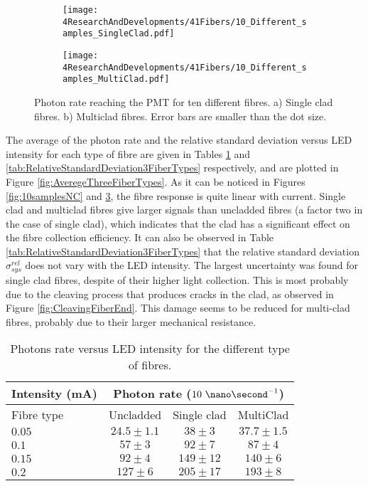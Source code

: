 \begin{figure}
\centering
    \begin{subfigure}[b]{1\textwidth}
    \centering
    \texttt{[image: 4ResearchAndDevelopments/41Fibers/10\_Different\_samples\_SingleClad.pdf]}  
    \caption{\label{subfig:10samplesSC}}
    \end{subfigure}
    \hfill
    \begin{subfigure}[b]{1\textwidth}
    \centering
    \texttt{[image: 4ResearchAndDevelopments/41Fibers/10\_Different\_samples\_MultiClad.pdf]}  
    \caption{\label{subfig:10samplesMC}}
    \end{subfigure}
 \caption{Photon rate reaching the PMT for ten different fibres. a) Single clad fibres. b) Multiclad fibres. Error bars are smaller than the dot size.}
 \label{fig:10samplesThreeTypes}
\end{figure}
The average of the photon rate and the relative standard deviation versus LED intensity for each type of fibre are given in Tables \ref{tab:10DifferentSamples} and \ref{tab:RelativeStandardDeviation3FiberTypes} respectively, and are plotted in Figure \ref{fig:AveregeThreeFiberTypes}. As it can be noticed in Figures \ref{fig:10samplesNC} and \ref{fig:10samplesThreeTypes}, the fibre response is quite linear with current. Single clad and multiclad fibres give larger signals than uncladded fibres (a factor two in the case of single clad), which indicates that the clad has a significant effect on the fibre collection efficiency. It can also be observed in Table \ref{tab:RelativeStandardDeviation3FiberTypes} that the relative standard deviation $\sigma^{rel}_{sys}$ does not vary with the LED intensity. The largest uncertainty was found for single clad fibres, despite of their higher light collection. This is most probably due to the cleaving process that produces cracks in the clad, as observed in Figure \ref{fig:CleavingFiberEnd}. This damage seems to be reduced for multi-clad fibres, probably due to their larger mechanical resistance.

\begin{table}[h]
\centering{}%
\begin{tabular}{lccc}
\toprule 
Intensity (mA) & \multicolumn{3}{c}{Photon rate ($10~\nano\second^{-1}$)} \tabularnewline
\midrule
Fibre type & Uncladded & Single clad & MultiClad \tabularnewline
\midrule
\midrule 
$0.05$ & $24.5 \pm 1.1$ & $38 \pm 3$ & $37.7 \pm 1.5$ \tabularnewline
$0.1$ & $57 \pm 3$ & $92 \pm 7$ & $87 \pm 4$ \tabularnewline
$0.15$ & $92 \pm 4$ & $149 \pm 12$ & $140 \pm 6$ \tabularnewline
$0.2$ & $127 \pm 6$ & $205 \pm 17$ & $193 \pm 8$ \tabularnewline
\bottomrule
\end{tabular}
\caption{Photons rate versus LED intensity for the different type of fibres.}
\label{tab:10DifferentSamples}
\end{table}

